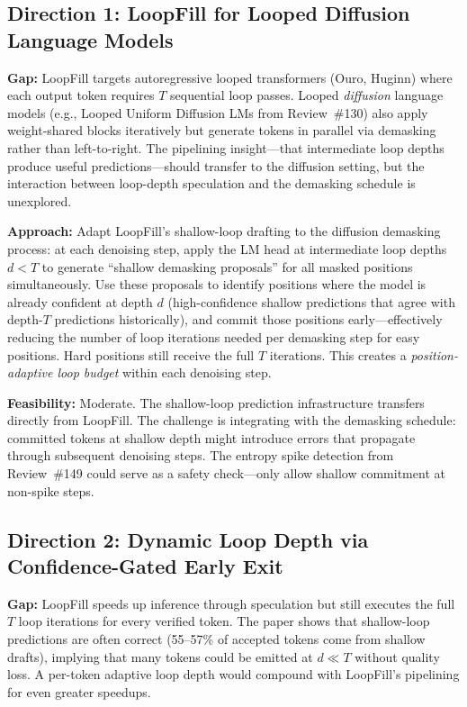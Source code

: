 \documentclass[11pt,a4paper]{article}
\begin{document}
\subsection{Direction 1: LoopFill for Looped Diffusion Language Models}
\textbf{Gap:} LoopFill targets autoregressive looped transformers (Ouro, Huginn) where each output token requires $T$ sequential loop passes. Looped \emph{diffusion} language models (e.g., Looped Uniform Diffusion LMs from Review~\#130) also apply weight-shared blocks iteratively but generate tokens in parallel via demasking rather than left-to-right. The pipelining insight---that intermediate loop depths produce useful predictions---should transfer to the diffusion setting, but the interaction between loop-depth speculation and the demasking schedule is unexplored.

\textbf{Approach:} Adapt LoopFill's shallow-loop drafting to the diffusion demasking process: at each denoising step, apply the LM head at intermediate loop depths $d < T$ to generate ``shallow demasking proposals'' for all masked positions simultaneously. Use these proposals to identify positions where the model is already confident at depth $d$ (high-confidence shallow predictions that agree with depth-$T$ predictions historically), and commit those positions early---effectively reducing the number of loop iterations needed per demasking step for easy positions. Hard positions still receive the full $T$ iterations. This creates a \emph{position-adaptive loop budget} within each denoising step.

\textbf{Feasibility:} Moderate. The shallow-loop prediction infrastructure transfers directly from LoopFill. The challenge is integrating with the demasking schedule: committed tokens at shallow depth might introduce errors that propagate through subsequent denoising steps. The entropy spike detection from Review~\#149 could serve as a safety check---only allow shallow commitment at non-spike steps.

\subsection{Direction 2: Dynamic Loop Depth via Confidence-Gated Early Exit}
\textbf{Gap:} LoopFill speeds up inference through speculation but still executes the full $T$ loop iterations for every verified token. The paper shows that shallow-loop predictions are often correct (55--57\% of accepted tokens come from shallow drafts), implying that many tokens could be emitted at $d \ll T$ without quality loss. A per-token adaptive loop depth would compound with LoopFill's pipelining for even greater speedups.
\end{document}
